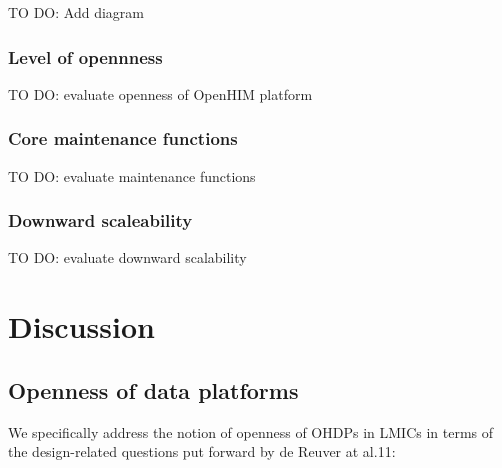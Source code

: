 \documentclass[
  authoryear]{elsarticle}
\begin{document}
TO DO: Add diagram

\subsubsection{Level of opennness}\label{level-of-opennness}

TO DO: evaluate openness of OpenHIM platform

\subsubsection{Core maintenance
functions}\label{core-maintenance-functions}

TO DO: evaluate maintenance functions

\subsubsection{Downward scaleability}\label{downward-scaleability}

TO DO: evaluate downward scalability

\section{Discussion}\label{discussion}

\subsection{Openness of data
platforms}\label{openness-of-data-platforms}

We specifically address the notion of openness of OHDPs in LMICs in
terms of the design-related questions put forward by de Reuver at al.11:
\end{document}
